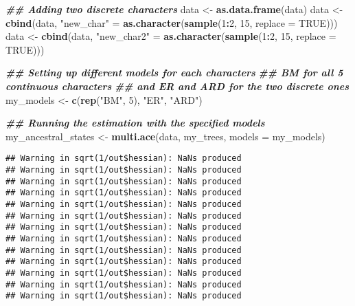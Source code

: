 \documentclass[
]{book}
\newenvironment{Shaded}{\begin{snugshade}}{\end{snugshade}}
\newcommand{\AttributeTok}[1]{\textcolor[rgb]{0.13,0.29,0.53}{#1}}
\newcommand{\ConstantTok}[1]{\textcolor[rgb]{0.56,0.35,0.01}{#1}}
\newcommand{\DecValTok}[1]{\textcolor[rgb]{0.00,0.00,0.81}{#1}}
\newcommand{\DocumentationTok}[1]{\textcolor[rgb]{0.56,0.35,0.01}{\textbf{\textit{#1}}}}
\newcommand{\FunctionTok}[1]{\textcolor[rgb]{0.13,0.29,0.53}{\textbf{#1}}}
\newcommand{\NormalTok}[1]{#1}
\newcommand{\OtherTok}[1]{\textcolor[rgb]{0.56,0.35,0.01}{#1}}
\newcommand{\SpecialCharTok}[1]{\textcolor[rgb]{0.81,0.36,0.00}{\textbf{#1}}}
\newcommand{\StringTok}[1]{\textcolor[rgb]{0.31,0.60,0.02}{#1}}
\begin{document}
\begin{Shaded}
\begin{Highlighting}[]
\DocumentationTok{\#\# Adding two discrete characters}
\NormalTok{data }\OtherTok{\textless{}{-}} \FunctionTok{as.data.frame}\NormalTok{(data)}
\NormalTok{data }\OtherTok{\textless{}{-}} \FunctionTok{cbind}\NormalTok{(data, }\StringTok{"new\_char"} \OtherTok{=} \FunctionTok{as.character}\NormalTok{(}\FunctionTok{sample}\NormalTok{(}\DecValTok{1}\SpecialCharTok{:}\DecValTok{2}\NormalTok{, }\DecValTok{15}\NormalTok{, }\AttributeTok{replace =} \ConstantTok{TRUE}\NormalTok{)))}
\NormalTok{data }\OtherTok{\textless{}{-}} \FunctionTok{cbind}\NormalTok{(data, }\StringTok{"new\_char2"} \OtherTok{=} \FunctionTok{as.character}\NormalTok{(}\FunctionTok{sample}\NormalTok{(}\DecValTok{1}\SpecialCharTok{:}\DecValTok{2}\NormalTok{, }\DecValTok{15}\NormalTok{, }\AttributeTok{replace =} \ConstantTok{TRUE}\NormalTok{)))}

\DocumentationTok{\#\# Setting up different models for each characters}
\DocumentationTok{\#\# BM for all 5 continuous characters}
\DocumentationTok{\#\# and ER and ARD for the two discrete ones}
\NormalTok{my\_models }\OtherTok{\textless{}{-}} \FunctionTok{c}\NormalTok{(}\FunctionTok{rep}\NormalTok{(}\StringTok{"BM"}\NormalTok{, }\DecValTok{5}\NormalTok{), }\StringTok{"ER"}\NormalTok{, }\StringTok{"ARD"}\NormalTok{)}

\DocumentationTok{\#\# Running the estimation with the specified models}
\NormalTok{my\_ancestral\_states }\OtherTok{\textless{}{-}} \FunctionTok{multi.ace}\NormalTok{(data, my\_trees, }\AttributeTok{models =}\NormalTok{ my\_models)}
\end{Highlighting}
\end{Shaded}

\begin{verbatim}
## Warning in sqrt(1/out$hessian): NaNs produced
## Warning in sqrt(1/out$hessian): NaNs produced
## Warning in sqrt(1/out$hessian): NaNs produced
## Warning in sqrt(1/out$hessian): NaNs produced
## Warning in sqrt(1/out$hessian): NaNs produced
## Warning in sqrt(1/out$hessian): NaNs produced
## Warning in sqrt(1/out$hessian): NaNs produced
## Warning in sqrt(1/out$hessian): NaNs produced
## Warning in sqrt(1/out$hessian): NaNs produced
## Warning in sqrt(1/out$hessian): NaNs produced
## Warning in sqrt(1/out$hessian): NaNs produced
## Warning in sqrt(1/out$hessian): NaNs produced
## Warning in sqrt(1/out$hessian): NaNs produced
\end{verbatim}
\end{document}
